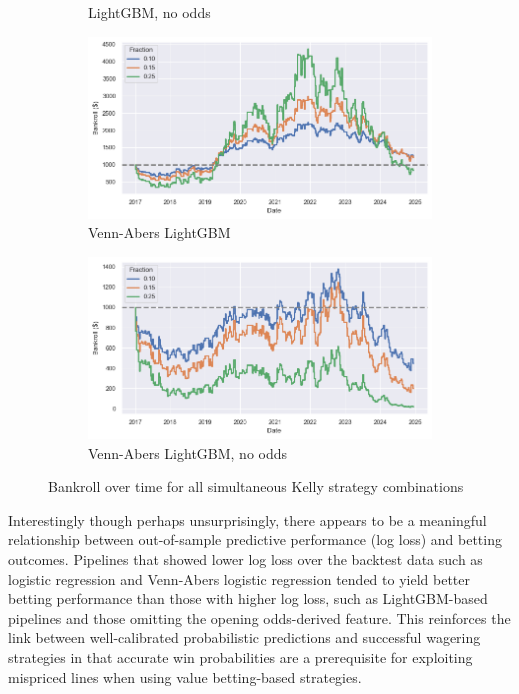 \documentclass[12pt,twoside]{report}
\begin{document}
\begin{figure}[!htb]
\begin{subfigure}{.5\linewidth}
  \caption{LightGBM, no odds}
\end{subfigure}
\begin{subfigure}{.5\linewidth}
  \centering
  \includegraphics[width=\linewidth]{figures/bankroll_va_lightgbm_simultaneous.png}
  \caption{Venn-Abers LightGBM}
\end{subfigure}%
\begin{subfigure}{.5\linewidth}
  \centering
  \includegraphics[width=\linewidth]{figures/bankroll_va_lightgbm_no_odds_simultaneous.png}
  \caption{Venn-Abers LightGBM, no odds}
\end{subfigure}
\caption{Bankroll over time for all simultaneous Kelly strategy combinations}
\end{figure}


Interestingly though perhaps unsurprisingly, there appears to be a meaningful relationship between out-of-sample predictive performance (log loss) and betting outcomes. Pipelines that showed lower log loss over the backtest data such as logistic regression and Venn-Abers logistic regression tended to yield better betting performance than those with higher log loss, such as LightGBM-based pipelines and those omitting the opening odds-derived feature. This reinforces the link between well-calibrated probabilistic predictions and successful wagering strategies in that accurate win probabilities are a prerequisite for exploiting mispriced lines when using value betting-based strategies.
\end{document}

